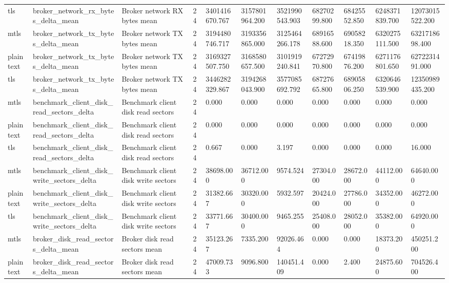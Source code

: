 \begin{longtable}{lllllllllll}
tls & broker\_network\_rx\_bytes\_delta\_mean & Broker network RX bytes mean & 24 & 3401416670.767 & 3157801964.200 & 3521990543.903 & 68270299.800 & 68425552.850 & 6248371839.700 & 12073015522.200 \\
mtls & broker\_network\_tx\_bytes\_delta\_mean & Broker network TX bytes mean & 24 & 3194480746.717 & 3193356865.000 & 3125464266.178 & 68916588.600 & 69058218.350 & 6320275111.500 & 6321718698.400 \\
plaintext & broker\_network\_tx\_bytes\_delta\_mean & Broker network TX bytes mean & 24 & 3169327507.750 & 3168580657.500 & 3101919240.841 & 67272970.800 & 67419876.200 & 6271176801.650 & 6272231491.000 \\
tls & broker\_network\_tx\_bytes\_delta\_mean & Broker network TX bytes mean & 24 & 3446282329.867 & 3194268043.900 & 3577085692.792 & 68727665.800 & 68905806.250 & 6320646539.900 & 12350989435.200 \\
mtls & benchmark\_client\_disk\_read\_sectors\_delta & Benchmark client disk read sectors & 24 & 0.000 & 0.000 & 0.000 & 0.000 & 0.000 & 0.000 & 0.000 \\
plaintext & benchmark\_client\_disk\_read\_sectors\_delta & Benchmark client disk read sectors & 24 & 0.000 & 0.000 & 0.000 & 0.000 & 0.000 & 0.000 & 0.000 \\
tls & benchmark\_client\_disk\_read\_sectors\_delta & Benchmark client disk read sectors & 24 & 0.667 & 0.000 & 3.197 & 0.000 & 0.000 & 0.000 & 16.000 \\
mtls & benchmark\_client\_disk\_write\_sectors\_delta & Benchmark client disk write sectors & 24 & 38698.000 & 36712.000 & 9574.524 & 27304.000 & 28672.000 & 44112.000 & 64640.000 \\
plaintext & benchmark\_client\_disk\_write\_sectors\_delta & Benchmark client disk write sectors & 24 & 31382.667 & 30320.000 & 5932.597 & 20424.000 & 27786.000 & 34352.000 & 46272.000 \\
tls & benchmark\_client\_disk\_write\_sectors\_delta & Benchmark client disk write sectors & 24 & 33771.667 & 30400.000 & 9465.255 & 25408.000 & 28052.000 & 35382.000 & 64920.000 \\
mtls & broker\_disk\_read\_sectors\_delta\_mean & Broker disk read sectors mean & 24 & 35123.267 & 7335.200 & 92026.464 & 0.000 & 0.000 & 18373.200 & 450251.200 \\
plaintext & broker\_disk\_read\_sectors\_delta\_mean & Broker disk read sectors mean & 24 & 47009.733 & 9096.800 & 140451.409 & 0.000 & 2.400 & 24875.600 & 704526.400 \\

\end{longtable}
